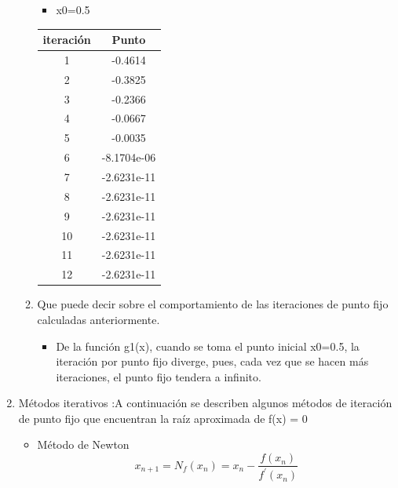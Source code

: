 \documentclass{udparticle}
\begin{document}
\begin{enumerate}
\begin{enumerate}
\begin{table}[H]
\begin{tabular} { |c|c|}
        \end{tabular}
        
    \end{table}
     \begin{itemize}
\item x0=0.5
\end{itemize}
\begin{table}[H]
    \centering
        \begin{tabular} { |c|c|}
        \hline
        iteración  &  Punto\\
        \hline
        1 &  -0.4614      \\
         \hline
        2 &   -0.3825   \\
         \hline
        3 &  -0.2366 \\
         \hline
        4 &  -0.0667    \\
         \hline
        5 &   -0.0035 \\
         \hline
        6 & -8.1704e-06     \\
         \hline
        7 &     -2.6231e-11 \\
         \hline
        8 &   -2.6231e-11   \\
         \hline
        9 &        -2.6231e-11 \\
         \hline
        10 &     -2.6231e-11    \\
         \hline
        11 &    -2.6231e-11 \\
         \hline
        12 &    -2.6231e-11  \\
        \hline
        \end{tabular}
    \end{table}
\vspace{3cm}
\item Que puede decir sobre el comportamiento de las iteraciones de punto fijo calculadas anteriormente.
\begin{itemize}

\item De la función g1(x), cuando se toma el punto inicial x0=0.5, la iteración por punto fijo diverge, pues, cada vez que se hacen más iteraciones, el punto fijo tendera a infinito. 
\end{itemize}

\end{enumerate}
\newpage
\item Métodos iterativos :A continuación se describen algunos métodos de iteración de punto fijo que encuentran la raíz aproximada de f(x) = 0
\begin{itemize}
        \item Método de Newton     
            \begin{equation*}
                 x_{n+1}=N_f(x_n)=x_n -  \frac{f(x_n)}{f^{'}(x_n)}
            \end{equation*}
        

\end{itemize}
\end{enumerate}
\end{document}
